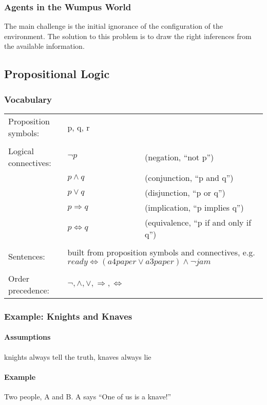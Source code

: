 \subsubsection{Agents in the Wumpus World}
The main challenge is the initial ignorance of the configuration of the
environment. The solution to this problem is to draw the right inferences from
the available information.

\subsection{Propositional Logic}
\subsubsection{Vocabulary}
\begin{tabular}{l l l}
Proposition symbols: & p, q, r\\\\
Logical connectives: & $\neg{p}$             & (negation, ``not p'')\\
                     & $p\land{q}$           & (conjunction, ``p and q'')\\
                     & $p\lor{q}$            & (disjunction, ``p or q'')\\
                     & $p\Rightarrow{q}$     & (implication, ``p implies q'')\\
                     & $p\Leftrightarrow{q}$ & (equivalence, ``p if and only if q'')\\\\
Sentences:           & \multicolumn{2}{p{8cm}}{built from proposition symbols and connectives, e.g.
$ready \Leftrightarrow (a4paper \lor a3paper) \land \neg{jam}$}\\\\
Order precedence:    & $\neg, \land, \lor, \Rightarrow, \Leftrightarrow$\\
\end{tabular}

\subsubsection{Example: Knights and Knaves}
\paragraph{Assumptions} knights always tell the truth, knaves always lie
\paragraph{Example} Two people, A and B. A says ``One of us is a knave!''

